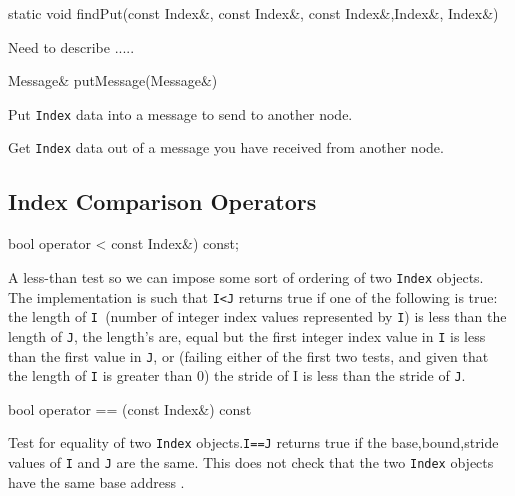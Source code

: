 \begin{smallcode}
static void findPut(const Index&, const Index&, const Index&,Index&, Index&)
\end{smallcode} 
Need to describe .....
  
\begin{smallcode}
Message& putMessage(Message&)
\end{smallcode} 
Put \texttt{Index} data into a message to send to another node. 
\begin{smallcode}
Message&getMessage{Message&) 
\end{smallcode}
Get  \texttt{Index} data out of a message you have received from another node. 

\subsection{Index Comparison Operators} 
\begin{smallcode}
bool operator < const Index&) const;
\end{smallcode} 
A less-than test so we can impose some sort of ordering of two \texttt{Index} objects. The implementation is such that \texttt{I<J} returns true if one of the following is true: 
the length of \texttt{I }(number of integer index values represented by \texttt{I}) is less than the length of \texttt{J}, the length's are, equal but the first integer index value in 
\texttt{I} is less than the first value in \texttt{J}, or (failing either of the first two tests, and given that the length of \texttt{I} is greater than 0) the stride of I is less than the stride of \texttt{J}. 
\begin{smallcode}
bool operator == (const Index&) const 
\end{smallcode}
Test for equality of two \texttt{Index} objects.\texttt{I==J} returns true if the {base,bound,stride} values of \texttt{I} and \texttt{J} are the same. This does not check that the two 
\texttt{Index} objects have the same base address . 



